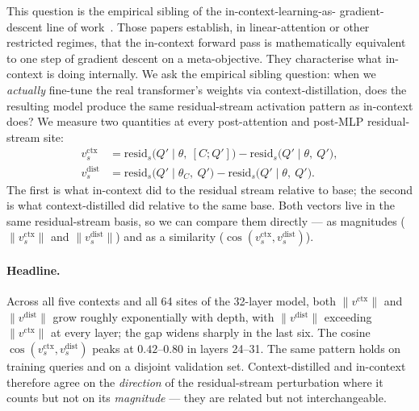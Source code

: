 \documentclass{article}
\begin{document}
This question is the empirical sibling of the in-context-learning-as-
gradient-descent line of work~\citep{vonoswald2023transformers,
akyurek2023learning, garg2022what}. Those papers establish, in
linear-attention or other restricted regimes, that the in-context
forward pass is mathematically equivalent to one step of gradient
descent on a meta-objective. They characterise what in-context is
doing internally. We ask the empirical sibling question: when we
\emph{actually} fine-tune the real transformer's weights via
context-distillation, does the resulting model produce the same
residual-stream activation pattern as in-context does? We measure two
quantities at every post-attention and post-MLP residual-stream site:
\begin{align*}
v^\text{ctx}_s &= \mathrm{resid}_s\bigl(Q' \mid \theta,\ [C; Q']\bigr) -
                  \mathrm{resid}_s\bigl(Q' \mid \theta,\ Q'\bigr), \\
v^\text{dist}_s  &= \mathrm{resid}_s\bigl(Q' \mid \theta_C,\ Q'\bigr) -
                  \mathrm{resid}_s\bigl(Q' \mid \theta,\ Q'\bigr).
\end{align*}
The first is what in-context did to the residual stream relative to
base; the second is what context-distilled did relative to the same
base. Both vectors live in the same residual-stream basis, so we can
compare them directly --- as magnitudes ($\|v^\text{ctx}_s\|$ and
$\|v^\text{dist}_s\|$) and as a similarity
($\cos(v^\text{ctx}_s, v^\text{dist}_s)$).

\paragraph{Headline.}
Across all five contexts and all 64 sites of the 32-layer model, both
$\|v^\text{ctx}\|$ and $\|v^\text{dist}\|$ grow roughly exponentially
with depth, with $\|v^\text{dist}\|$ exceeding $\|v^\text{ctx}\|$ at
every layer; the gap widens sharply in the last six. The cosine
$\cos(v^\text{ctx}_s, v^\text{dist}_s)$ peaks at $0.42$--$0.80$ in
layers 24--31. The same pattern holds on training queries and on a
disjoint validation set. Context-distilled and in-context therefore
agree on the \emph{direction} of the residual-stream perturbation
where it counts but not on its \emph{magnitude} --- they are related
but not interchangeable.
\end{document}
